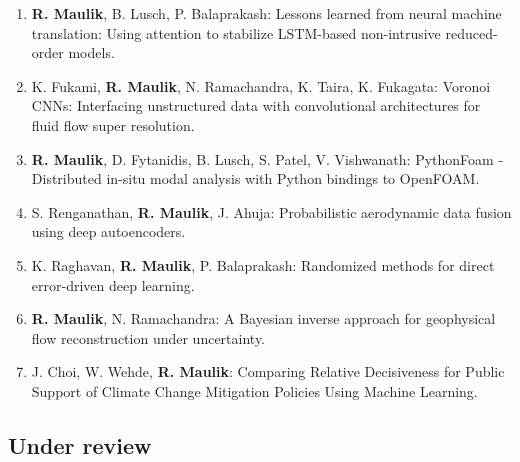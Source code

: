\documentclass[letterpaper]{article}
\begin{document}
\begin{enumerate}

\item \textbf{R. Maulik}, B. Lusch, P. Balaprakash: Lessons learned from neural machine translation: Using attention to stabilize LSTM-based non-intrusive reduced-order models.

\item K. Fukami, \textbf{R. Maulik}, N. Ramachandra, K. Taira, K. Fukagata: Voronoi CNNs: Interfacing unstructured data with convolutional architectures for fluid flow super resolution.

\item \textbf{R. Maulik}, D. Fytanidis, B. Lusch, S. Patel, V. Vishwanath: PythonFoam - Distributed in-situ modal analysis with Python bindings to OpenFOAM.

\item S. Renganathan, \textbf{R. Maulik}, J. Ahuja: Probabilistic aerodynamic data fusion using deep autoencoders.

\item K. Raghavan, \textbf{R. Maulik}, P. Balaprakash: Randomized methods for direct error-driven deep learning.

\item \textbf{R. Maulik}, N. Ramachandra: A Bayesian inverse approach for geophysical flow reconstruction under uncertainty.

\item J. Choi, W. Wehde, \textbf{R. Maulik}: Comparing Relative Decisiveness for Public Support of Climate Change Mitigation Policies Using Machine Learning.



\end{enumerate}


\subsection*{Under review}
\end{document}
